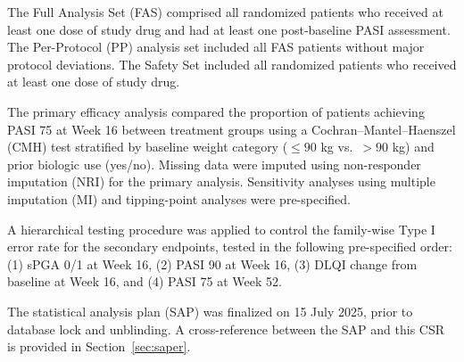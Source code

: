 The Full Analysis Set (FAS) comprised all randomized patients who received at least one dose of study drug and had at least one post-baseline PASI assessment. The Per-Protocol (PP) analysis set included all FAS patients without major protocol deviations. The Safety Set included all randomized patients who received at least one dose of study drug.

\vspace{4pt}
The primary efficacy analysis compared the proportion of patients achieving PASI 75 at Week 16 between treatment groups using a Cochran--Mantel--Haenszel (CMH) test stratified by baseline weight category ($\le 90$ kg vs.\ $> 90$ kg) and prior biologic use (yes/no). Missing data were imputed using non-responder imputation (NRI) for the primary analysis. Sensitivity analyses using multiple imputation (MI) and tipping-point analyses were pre-specified.

\vspace{4pt}
A hierarchical testing procedure was applied to control the family-wise Type I error rate for the secondary endpoints, tested in the following pre-specified order: (1) sPGA 0/1 at Week 16, (2) PASI 90 at Week 16, (3) DLQI change from baseline at Week 16, and (4) PASI 75 at Week 52.

\begin{notebox}
The statistical analysis plan (SAP) was finalized on 15 July 2025, prior to database lock and unblinding. A cross-reference between the SAP and this CSR is provided in Section~\ref{sec:saper}.
\end{notebox}

\newpage

